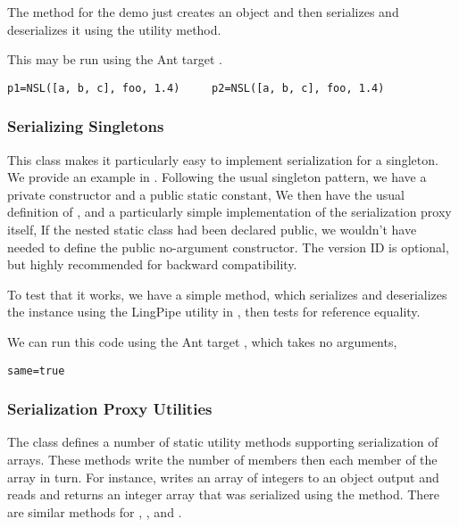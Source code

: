 The  method for the demo just creates an object
and then serializes and deserializes it using the utility method.
%

This may be run using the Ant target .
%
\begin{verbatim}
p1=NSL([a, b, c], foo, 1.4)     p2=NSL([a, b, c], foo, 1.4)
\end{verbatim}

\subsubsection{Serializing Singletons}

This class makes it particularly easy to implement serialization for a
singleton.  We provide an example in .  Following
the usual singleton pattern, we have a private constructor and a public
static constant,
%
%
We then have the usual definition of , and a
particularly simple implementation of the serialization proxy itself,
%
%
If the nested static class had been declared public, we wouldn't have
needed to define the public no-argument constructor.  The version ID
is optional, but highly recommended for backward compatibility.

To test that it works, we have a simple  method,
%
%
which serializes and deserializes the instance using the 
LingPipe utility in , then tests
for reference equality.

We can run this code using the Ant target ,
which takes no arguments,
%
\begin{verbatim}
same=true
\end{verbatim}

\subsubsection{Serialization Proxy Utilities}

The  class defines a number of static
utility methods supporting serialization of arrays.  These methods
write the number of members then each member of the array in turn.
For instance,  writes an array of
integers to an object output and  reads
and returns an integer array that was serialized using the
 method.  There are similar methods for ,
, and .

